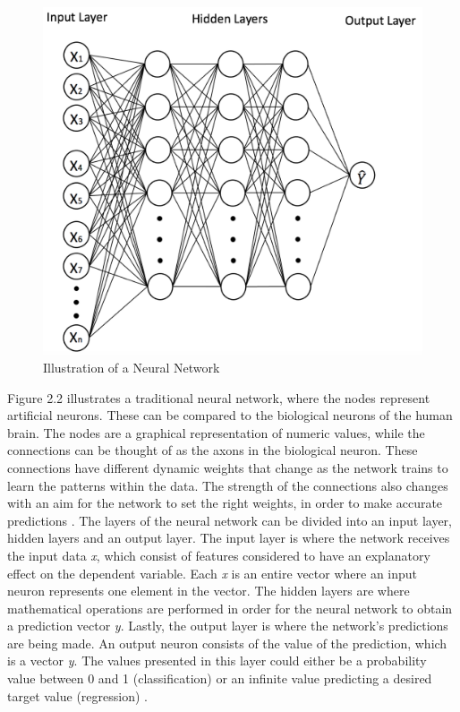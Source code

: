 \indent\newline 
\begin{figure}[H]
\centering
\includegraphics [scale=0.60,angle=360]{figures/neur.png}
\caption{Illustration of a Neural Network}
\label{fig:neur}
\end{figure}

\indent\newline
Figure 2.2 illustrates a traditional neural network, where the nodes represent artificial neurons. These can be compared to the biological neurons of the human brain. The nodes are a graphical representation of numeric values, while the connections can be thought of as the axons in the biological neuron. These connections have different dynamic weights that change as the network trains to learn the patterns within the data. The strength of the connections also changes with an aim for the network to set the right weights, in order to make accurate predictions \cite{opper}. The layers of the neural network can be divided into an input layer, hidden layers and an output layer. The input layer is where the network receives the input data \textit{x}, which consist of features considered to have an explanatory effect on the dependent variable. Each \textit{x} is an entire vector where an input neuron represents one element in the vector. The hidden layers are where mathematical operations are performed in order for the neural network to obtain a prediction vector \textit{y}. Lastly, the output layer is where the network's predictions are being made. An output neuron consists of the value of the prediction, which is a vector \textit{y}. The values presented in this layer could either be a probability value between 0 and 1 (classification) or an infinite value predicting a desired target value (regression) \cite{opper}. 

